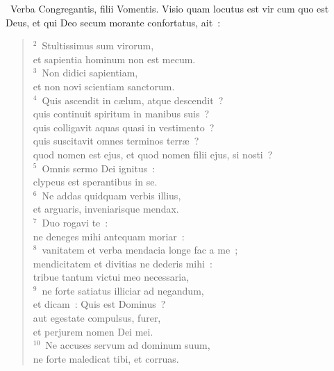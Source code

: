 ~\lettrine[lines=10,image=true,loversize=0.05,lraise=-0.03]{V}{}erba Congregantis, filii Vomentis. Visio quam locutus est vir cum quo est Deus, et qui Deo secum morante confortatus, ait~:
\begin{flushleft}\begin{verse}\vspace{6pt}${}^{2}$~Stultissimus sum virorum,\\ et sapientia hominum non est mecum.\\
${}^{3}$~Non didici sapientiam,\\ et non novi scientiam sanctorum.\\
${}^{4}$~Quis ascendit in c\ae lum, atque descendit~?\\ quis continuit spiritum in manibus suis~?\\ quis colligavit aquas quasi in vestimento~?\\ quis suscitavit omnes terminos terr\ae~?\\ quod nomen est ejus, et quod nomen filii ejus, si nosti~?\\
${}^{5}$~Omnis sermo Dei ignitus~:\\ clypeus est sperantibus in se.\\
${}^{6}$~Ne addas quidquam verbis illius,\\ et arguaris, inveniarisque mendax.\\
${}^{7}$~Duo rogavi te~:\\ ne deneges mihi antequam moriar~:\\
${}^{8}$~vanitatem et verba mendacia longe fac a me~;\\ mendicitatem et divitias ne dederis mihi~:\\ tribue tantum victui meo necessaria,\\
${}^{9}$~ne forte satiatus illiciar ad negandum,\\ et dicam~: Quis est Dominus~?\\ aut egestate compulsus, furer,\\ et perjurem nomen Dei mei.\\
${}^{10}$~Ne accuses servum ad dominum suum,\\ ne forte maledicat tibi, et corruas.\end{verse}\end{flushleft}


